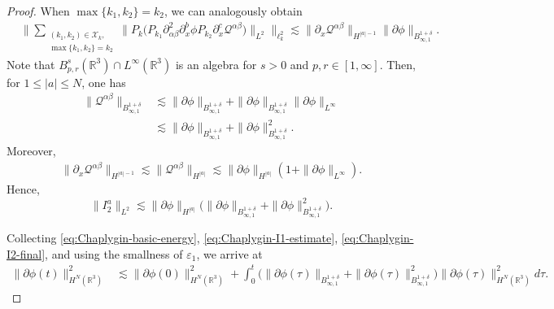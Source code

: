 \documentclass[10pt,a4paper]{amsart}
\def\cQ{\mathcal Q}
\def\ls{\lesssim}
\begin{document}
\begin{proof}
		When $\max\{k_1,k_2\}=k_2$, we can analogously obtain
		\begin{equation}\label{eq:Chaplygin-I2-second-frequency-case}
			\begin{aligned}
				&
				\big\|
				\sum_{\substack{(k_1,k_2)\in\mathcal X_k,\\
				\max\{k_1,k_2\}=k_2}}
				\big\|
				P_k
				\big(
				P_{k_1}\partial_{\alpha\beta}^2\partial_x^b\phi
				P_{k_2}\partial_x^c\cQ^{\alpha\beta}
				\big)
				\big\|_{L^2}
				\big\|_{\ell_k^2}
				\ls
				\|\partial_x\cQ^{\alpha\beta}\|_{H^{|a|-1}}
				\|\partial\phi\|_{B_{\infty,1}^{1+\delta}}.
			\end{aligned}
		\end{equation}
		Note that
		$B_{p,r}^s(\mathbb R^3)\cap L^\infty(\mathbb R^3)$ is an algebra for
		$s>0$ and $p,r\in[1,\infty]$. Then, for $1\le |a|\le N$, one has
		\begin{equation}\label{eq:Chaplygin-Q-Besov}
			\begin{aligned}
				\|\cQ^{\alpha\beta}\|_{B_{\infty,1}^{1+\delta}}
				&\ls
				\|\partial\phi\|_{B_{\infty,1}^{1+\delta}}
				+
				\|\partial\phi\|_{B_{\infty,1}^{1+\delta}}
				\|\partial\phi\|_{L^\infty}
				\\
				&\ls
				\|\partial\phi\|_{B_{\infty,1}^{1+\delta}}
				+
				\|\partial\phi\|_{B_{\infty,1}^{1+\delta}}^2.
			\end{aligned}
		\end{equation}
		Moreover,
		\begin{equation}\label{eq:Chaplygin-Q-high-Sobolev}
			\begin{aligned}
				\|\partial_x\cQ^{\alpha\beta}\|_{H^{|a|-1}}
				\ls
				\|\cQ^{\alpha\beta}\|_{H^{|a|}}
				\ls
				\|\partial\phi\|_{H^{|a|}}
				\left(
				1+
				\|\partial\phi\|_{L^\infty}
				\right).
			\end{aligned}
		\end{equation}
		Hence,
		\begin{equation}\label{eq:Chaplygin-I2-final}
			\|I_2^a\|_{L^2}
			\ls
			\|\partial\phi\|_{H^{|a|}}
			\big(
			\|\partial\phi\|_{B_{\infty,1}^{1+\delta}}
			+
			\|\partial\phi\|_{B_{\infty,1}^{1+\delta}}^2
			\big).
		\end{equation}
	
		
		Collecting \eqref{eq:Chaplygin-basic-energy},
		\eqref{eq:Chaplygin-I1-estimate},
		\eqref{eq:Chaplygin-I2-final}, and using the smallness of
		$\varepsilon_1$, we arrive at
		\begin{equation}\label{eq:Chaplygin-energy-integral}
			\begin{aligned}
				\|\partial\phi(t)\|_{H^N(\mathbb R^3)}^2
				&\ls
				\|\partial\phi(0)\|_{H^N(\mathbb R^3)}^2
				+\int_0^t
				\big(
				\|\partial\phi(\tau)\|_{B_{\infty,1}^{1+\delta}}
				+\|\partial\phi(\tau)\|_{B_{\infty,1}^{1+\delta}}^2
				\big)
				\|\partial\phi(\tau)\|_{H^N(\mathbb R^3)}^2
				d\tau.
			\end{aligned}
		\end{equation}
		

\end{proof}
\end{document}
